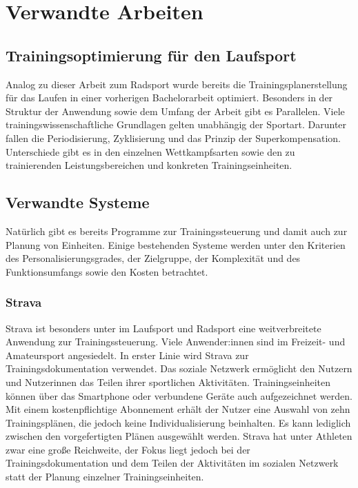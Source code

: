 \chapter{Verwandte Arbeiten}
\label{sec:verwandt}

\section{Trainingsoptimierung für den Laufsport}
\label{sec:verwandt:sec1}
Analog zu dieser Arbeit zum Radsport wurde bereits die Trainingsplanerstellung für das Laufen in einer vorherigen Bachelorarbeit optimiert. Besonders in der Struktur der Anwendung sowie dem Umfang der Arbeit gibt es Parallelen. Viele trainingswissenschaftliche Grundlagen gelten unabhängig der Sportart. Darunter fallen die Periodisierung, Zyklisierung und das Prinzip der Superkompensation. Unterschiede gibt es in den einzelnen Wettkampfsarten sowie den zu trainierenden Leistungsbereichen und konkreten Trainingseinheiten.

\section{Verwandte Systeme}
Natürlich  gibt es bereits Programme zur Trainingssteuerung und damit auch zur Planung von Einheiten. Einige bestehenden Systeme werden unter den Kriterien des Personalisierungsgrades, der Zielgruppe, der Komplexität und des Funktionsumfangs sowie den Kosten betrachtet.

\subsection{Strava}
Strava \cite{StravaWeb} ist besonders unter im Laufsport und Radsport eine weitverbreitete Anwendung zur Trainingssteuerung. Viele Anwender:innen sind im Freizeit- und Amateursport angesiedelt. In erster Linie wird Strava zur Trainingsdokumentation verwendet. Das soziale Netzwerk ermöglicht den Nutzern und Nutzerinnen das Teilen ihrer sportlichen Aktivitäten. Trainingseinheiten können über das Smartphone oder verbundene Geräte auch aufgezeichnet werden. Mit einem kostenpflichtige Abonnement erhält der Nutzer eine Auswahl von zehn Trainingsplänen, die jedoch keine Individualisierung beinhalten. Es kann lediglich zwischen den vorgefertigten Plänen ausgewählt werden. Strava hat unter Athleten zwar eine große Reichweite, der Fokus liegt jedoch bei der Trainingsdokumentation und dem Teilen der Aktivitäten im sozialen Netzwerk statt der Planung einzelner Trainingseinheiten.

